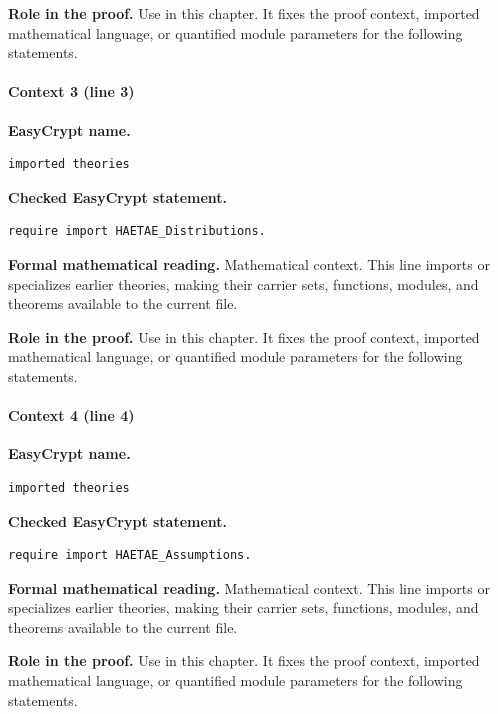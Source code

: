 \noindent\textbf{Role in the proof.}
Use in this chapter. It fixes the proof context, imported mathematical language, or quantified module parameters for the following statements.

\paragraph{Context 3 (line 3)}
\noindent\textbf{EasyCrypt name.}
\begin{lstlisting}[language=EasyCrypt,basicstyle=\ttfamily\scriptsize]
imported theories
\end{lstlisting}
\noindent\textbf{Checked EasyCrypt statement.}
\begin{lstlisting}[language=EasyCrypt,basicstyle=\ttfamily\scriptsize]
require import HAETAE_Distributions.
\end{lstlisting}
\noindent\textbf{Formal mathematical reading.}
Mathematical context. This line imports or specializes earlier theories, making their carrier sets, functions, modules, and theorems available to the current file.

\noindent\textbf{Role in the proof.}
Use in this chapter. It fixes the proof context, imported mathematical language, or quantified module parameters for the following statements.

\paragraph{Context 4 (line 4)}
\noindent\textbf{EasyCrypt name.}
\begin{lstlisting}[language=EasyCrypt,basicstyle=\ttfamily\scriptsize]
imported theories
\end{lstlisting}
\noindent\textbf{Checked EasyCrypt statement.}
\begin{lstlisting}[language=EasyCrypt,basicstyle=\ttfamily\scriptsize]
require import HAETAE_Assumptions.
\end{lstlisting}
\noindent\textbf{Formal mathematical reading.}
Mathematical context. This line imports or specializes earlier theories, making their carrier sets, functions, modules, and theorems available to the current file.

\noindent\textbf{Role in the proof.}
Use in this chapter. It fixes the proof context, imported mathematical language, or quantified module parameters for the following statements.

